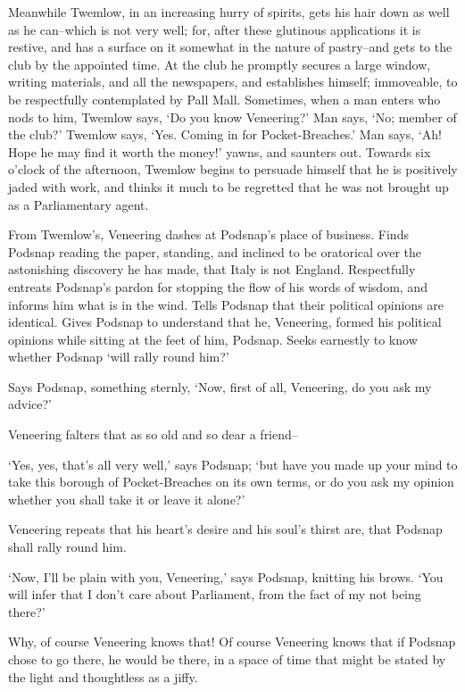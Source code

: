 Meanwhile Twemlow, in an increasing hurry of spirits, gets his hair down
as well as he can--which is not very well; for, after these glutinous
applications it is restive, and has a surface on it somewhat in the
nature of pastry--and gets to the club by the appointed time. At the
club he promptly secures a large window, writing materials, and all
the newspapers, and establishes himself; immoveable, to be respectfully
contemplated by Pall Mall. Sometimes, when a man enters who nods to
him, Twemlow says, ‘Do you know Veneering?’ Man says, ‘No; member of
the club?’ Twemlow says, ‘Yes. Coming in for Pocket-Breaches.’ Man says,
‘Ah! Hope he may find it worth the money!’ yawns, and saunters out.
Towards six o’clock of the afternoon, Twemlow begins to persuade
himself that he is positively jaded with work, and thinks it much to be
regretted that he was not brought up as a Parliamentary agent.

From Twemlow’s, Veneering dashes at Podsnap’s place of business. Finds
Podsnap reading the paper, standing, and inclined to be oratorical
over the astonishing discovery he has made, that Italy is not England.
Respectfully entreats Podsnap’s pardon for stopping the flow of his
words of wisdom, and informs him what is in the wind. Tells Podsnap that
their political opinions are identical. Gives Podsnap to understand that
he, Veneering, formed his political opinions while sitting at the feet
of him, Podsnap. Seeks earnestly to know whether Podsnap ‘will rally
round him?’

Says Podsnap, something sternly, ‘Now, first of all, Veneering, do you
ask my advice?’

Veneering falters that as so old and so dear a friend--

‘Yes, yes, that’s all very well,’ says Podsnap; ‘but have you made up
your mind to take this borough of Pocket-Breaches on its own terms, or
do you ask my opinion whether you shall take it or leave it alone?’

Veneering repeats that his heart’s desire and his soul’s thirst are,
that Podsnap shall rally round him.

‘Now, I’ll be plain with you, Veneering,’ says Podsnap, knitting his
brows. ‘You will infer that I don’t care about Parliament, from the fact
of my not being there?’

Why, of course Veneering knows that! Of course Veneering knows that if
Podsnap chose to go there, he would be there, in a space of time that
might be stated by the light and thoughtless as a jiffy.

